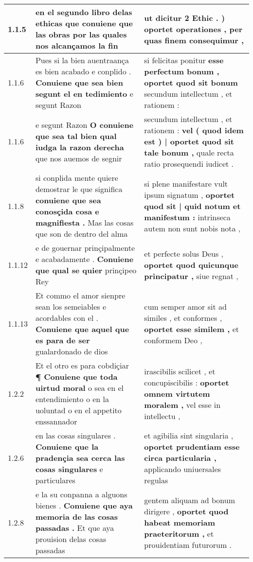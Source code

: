 \begin{tabular}{|p{1cm}|p{6.5cm}|p{6.5cm}|}

\hline
1.1.5 & en el segundo libro delas ethicas \textbf{ que conuiene que las obras } por las quales nos alcançamos la fin & ut dicitur 2 Ethic . ) \textbf{ oportet operationes , } per quas finem consequimur , \\\hline
1.1.6 & Pues si la bien auentraança es bien acabado e conplido . \textbf{ Conuiene que sea bien segunt el en tedimiento } e segunt Razon & si felicitas ponitur \textbf{ esse perfectum bonum , oportet quod sit bonum } secundum intellectum , et rationem : \\\hline
1.1.6 & e segunt Razon \textbf{ O conuiene que sea tal bien qual iudga la razon derecha } que nos auemos de segnir & secundum intellectum , et rationem : \textbf{ vel ( quod idem est ) | oportet quod sit tale bonum , } quale recta ratio prosequendi iudicet . \\\hline
1.1.8 & si conplida mente quiere demostrar le que significa \textbf{ conuiene que sea conosçida cosa e magnifiesta . } Mas las cosas que son de dentro del alma & si plene manifestare vult ipsum signatum , \textbf{ oportet quod sit | quid notum et manifestum : } intrinseca autem non sunt nobis nota , \\\hline
1.1.12 & e de gouernar prinçipalmente e acabadamente . \textbf{ Conuiene que qual se quier } prinçipeo Rey & et perfecte solus Deus , \textbf{ oportet quod quicunque principatur , } siue regnat , \\\hline
1.1.13 & Et commo el amor sienpre sean los semeiables e acordables con el . \textbf{ Conuiene que aquel que es para de ser } gualardonado de dios & cum semper amor sit ad similes , et conformes , \textbf{ oportet esse similem , } et conformem Deo , \\\hline
1.2.2 & Et el otro es para cobdiçiar \textbf{ ¶ Conuiene que toda uirtud moral } o sea en el entendimiento o en la uoluntad o en el appetito enssannador & irascibilis scilicet , et concupiscibilis : \textbf{ oportet omnem virtutem moralem , } vel esse in intellectu , \\\hline
1.2.6 & en las cosas singulares . \textbf{ Conuiene que la pradençia sea cerca las cosas singulares } e particulares & et agibilia sint singularia , \textbf{ oportet prudentiam esse circa particularia , } applicando uniuersales regulas \\\hline
1.2.8 & e la su conpanna a alguons bienes . \textbf{ Conuiene que aya memoria de las cosas passadas . } Et que aya prouision delas cosas passadas & gentem aliquam ad bonum dirigere , \textbf{ oportet quod habeat memoriam praeteritorum , } et prouidentiam futurorum . \\\hline

\end{tabular}

